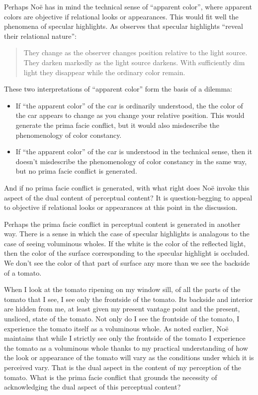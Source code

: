 \documentclass[12pt]{article}
\begin{document}
Perhaps Noë has in mind the technical sense of ``apparent color'', where apparent colors are objective if relational looks or appearances. This would fit well the phenomena of specular highlights. As \citet[141]{Johnston:1992ck} observes that specular highlights ``reveal their relational nature'':
	\begin{quote}
		They change as the observer changes position relative to the light source. They darken markedly as the light source darkens. With sufficiently dim light they disappear while the ordinary color remain.
	\end{quote}

	These two interpretations of ``apparent color'' form the basis of a dilemma:
	\begin{itemize}
		\item If ``the apparent color'' of the car is ordinarily understood, the the color of the car appears to change as you change your relative position. This would generate the prima facie conflict, but it would also misdescribe the phenomenology of color constancy. 
		\item If ``the apparent color'' of the car is understood in the technical sense, then it doesn't misdescribe the phenomenology of color constancy in the same way, but no prima facie conflict is generated. 
	\end{itemize}
And if no prima facie conflict is generated, with what right does Noë invoke this aspect of the dual content of perceptual content? It is question-begging to appeal to objective if relational looks or appearances at this point in the discussion.

Perhaps the prima facie conflict in perceptual content is generated in another way. There is a sense in which the case of specular highlights is analagous to the case of seeing voluminous wholes. If the white is the color of the reflected light, then the color of the surface corresponding to the specular highlight is occluded. We don't see the color of that part of surface any more than we see the backside of a tomato. 

When I look at the tomato ripening on my window sill, of all the parts of the tomato that I see, I see only the frontside of the tomato. Its backside and interior are hidden from me, at least given my present vantage point and the present, unsliced, state of the tomato. Not only do I see the frontside of the tomato, I experience the tomato itself as a voluminous whole. As noted earlier, Noë maintains that while I strictly see only the frontside of the tomato I experience the tomato as a voluminous whole thanks to my practical understanding of how the look or appearance of the tomato will vary as the conditions under which it is perceived vary. That is the dual aspect in the content of my perception of the tomato. What is the prima facie conflict that grounds the necessity of acknowledging the dual aspect of this perceptual content?
\end{document}
